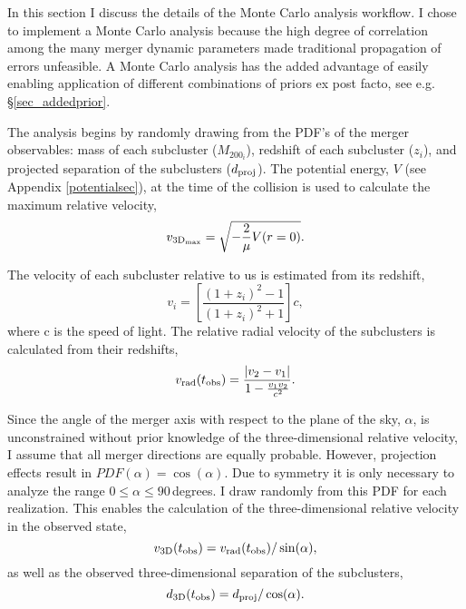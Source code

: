 In this section I discuss the details of the Monte Carlo analysis workflow.
I chose to implement a Monte Carlo analysis because the high degree of correlation among the many merger dynamic parameters made traditional propagation of errors unfeasible.
A Monte Carlo analysis has the added advantage of easily enabling application of different combinations of priors ex post facto, see e.g. \S\ref{sec_addedprior}. 

The analysis begins by randomly drawing from the PDF's of the merger observables: mass of each subcluster ($M_{200_i}$), redshift of each subcluster ($z_i$), and projected separation of the subclusters ($d_{\rm proj}$).  The potential energy, $V$ (see Appendix \ref{potentialsec}), at the time of the collision is used to calculate the maximum relative velocity,
\begin{displaymath}
v_{\rm 3D_{max}} = \sqrt{-\frac{2}{\mu}V(r=0)}.
\end{displaymath}

The velocity of each subcluster relative to us is estimated from its redshift,
\begin{displaymath}
v_i = \left[\frac{(1+z_i)^2-1}{(1+z_i)^2+1}\right] c,
\end{displaymath}
where c is the speed of light.
The relative radial velocity of the subclusters is calculated from their redshifts,
\begin{displaymath}
v_{\rm rad}(t_{\rm obs}) = \frac{|v_2-v_1|}{1-\frac{v_1 v_2}{c^2}}.
\end{displaymath}

Since the angle of the merger axis with respect to the plane of the sky, $\alpha$, is unconstrained without prior knowledge of the three-dimensional relative velocity, I assume that all merger directions are equally probable.
However, projection effects result in $PDF(\alpha) = \cos(\alpha)$.
Due to symmetry it is only necessary to analyze the range $0\le\alpha\le 90$\,degrees.
I draw randomly from this PDF for each realization.
This enables the calculation of the three-dimensional relative velocity in the observed state, 
\begin{equation}
v_{\rm 3D}(t_{\rm obs}) = v_{\rm rad}(t_{\rm obs})/\sin(\alpha),
\label{eq_v3Dobs}
\end{equation}
as well as the observed three-dimensional separation of the subclusters, 
\begin{equation}
d_{\rm 3D}(t_{\rm obs}) = d_{\rm proj}/\cos(\alpha).
\label{eq_d3D}
\end{equation}

